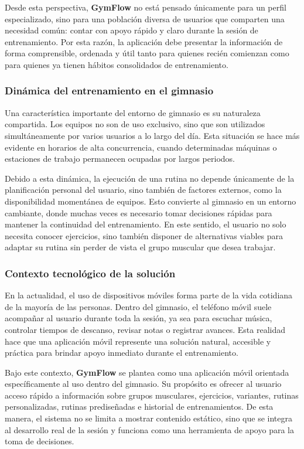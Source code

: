 Desde esta perspectiva, \textbf{GymFlow} no está pensado únicamente para un perfil especializado, sino para una población diversa de usuarios que comparten una necesidad común: contar con apoyo rápido y claro durante la sesión de entrenamiento. Por esta razón, la aplicación debe presentar la información de forma comprensible, ordenada y útil tanto para quienes recién comienzan como para quienes ya tienen hábitos consolidados de entrenamiento.

\subsubsection{Dinámica del entrenamiento en el gimnasio}

Una característica importante del entorno de gimnasio es su naturaleza compartida. Los equipos no son de uso exclusivo, sino que son utilizados simultáneamente por varios usuarios a lo largo del día. Esta situación se hace más evidente en horarios de alta concurrencia, cuando determinadas máquinas o estaciones de trabajo permanecen ocupadas por largos periodos.

Debido a esta dinámica, la ejecución de una rutina no depende únicamente de la planificación personal del usuario, sino también de factores externos, como la disponibilidad momentánea de equipos. Esto convierte al gimnasio en un entorno cambiante, donde muchas veces es necesario tomar decisiones rápidas para mantener la continuidad del entrenamiento. En este sentido, el usuario no solo necesita conocer ejercicios, sino también disponer de alternativas viables para adaptar su rutina sin perder de vista el grupo muscular que desea trabajar.

\subsubsection{Contexto tecnológico de la solución}

En la actualidad, el uso de dispositivos móviles forma parte de la vida cotidiana de la mayoría de las personas. Dentro del gimnasio, el teléfono móvil suele acompañar al usuario durante toda la sesión, ya sea para escuchar música, controlar tiempos de descanso, revisar notas o registrar avances. Esta realidad hace que una aplicación móvil represente una solución natural, accesible y práctica para brindar apoyo inmediato durante el entrenamiento.

Bajo este contexto, \textbf{GymFlow} se plantea como una aplicación móvil orientada específicamente al uso dentro del gimnasio. Su propósito es ofrecer al usuario acceso rápido a información sobre grupos musculares, ejercicios, variantes, rutinas personalizadas, rutinas prediseñadas e historial de entrenamientos. De esta manera, el sistema no se limita a mostrar contenido estático, sino que se integra al desarrollo real de la sesión y funciona como una herramienta de apoyo para la toma de decisiones.

